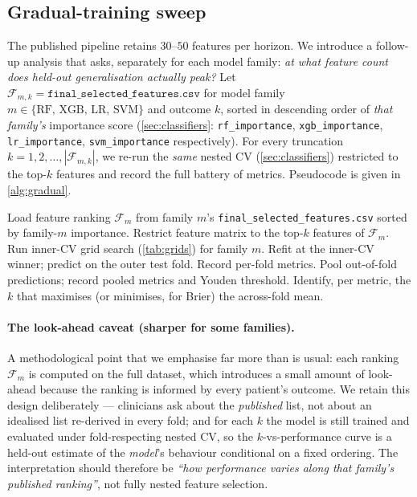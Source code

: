 \documentclass[11pt,a4paper]{article}
\providecommand{\Cref}[1]{\autoref{#1}}
\begin{document}
\subsection{Gradual-training sweep}
\label{sec:gradual}
The published pipeline retains $30$--$50$ features per horizon. We
introduce a follow-up analysis that asks, separately for each model
family: \emph{at what feature count does held-out generalisation actually
peak?} Let $\mathcal{F}_{m,k} = \texttt{final\_selected\_features.csv}$
for model family $m\in\{\text{RF, XGB, LR, SVM}\}$ and outcome $k$,
sorted in descending order of \emph{that family's} importance score
(\Cref{sec:classifiers}: \texttt{rf\_importance}, \texttt{xgb\_importance},
\texttt{lr\_importance}, \texttt{svm\_importance} respectively). For
every truncation $k = 1, 2, \dots, |\mathcal{F}_{m,k}|$, we re-run the
\emph{same} nested CV (\Cref{sec:classifiers}) restricted to the top-$k$
features and record the full battery of metrics. Pseudocode is given in
\Cref{alg:gradual}.

\begin{algorithm}[h]
\caption{Gradual-training sweep, per family $m$, per outcome.}
\label{alg:gradual}
\begin{algorithmic}[1]
\STATE Load feature ranking $\mathcal{F}_m$ from family $m$'s
       \texttt{final\_selected\_features.csv} sorted by family-$m$ importance.
  \STATE Restrict feature matrix to the top-$k$ features of $\mathcal{F}_m$.
    \STATE Run inner-CV grid search (\Cref{tab:grids}) for family $m$.
    \STATE Refit at the inner-CV winner; predict on the outer test fold.
    \STATE Record per-fold metrics.
  \ENDFOR
  \STATE Pool out-of-fold predictions; record pooled metrics and Youden
         threshold.
\ENDFOR
\STATE Identify, per metric, the $k$ that maximises (or minimises, for
       Brier) the across-fold mean.
\end{algorithmic}
\end{algorithm}

\paragraph{The look-ahead caveat (sharper for some families).}
A methodological point that we emphasise far more than is usual: each
ranking $\mathcal{F}_m$ is computed on the full dataset, which
introduces a small amount of look-ahead because the ranking is informed
by every patient's outcome. We retain this design deliberately ---
clinicians ask about the \emph{published} list, not about an idealised
list re-derived in every fold; and for each $k$ the model is still
trained and evaluated under fold-respecting nested CV, so the
$k$-vs-performance curve is a held-out estimate of the \emph{model}'s
behaviour conditional on a fixed ordering. The interpretation should
therefore be \emph{``how performance varies along that family's
published ranking''}, not fully nested feature selection.
\end{document}
